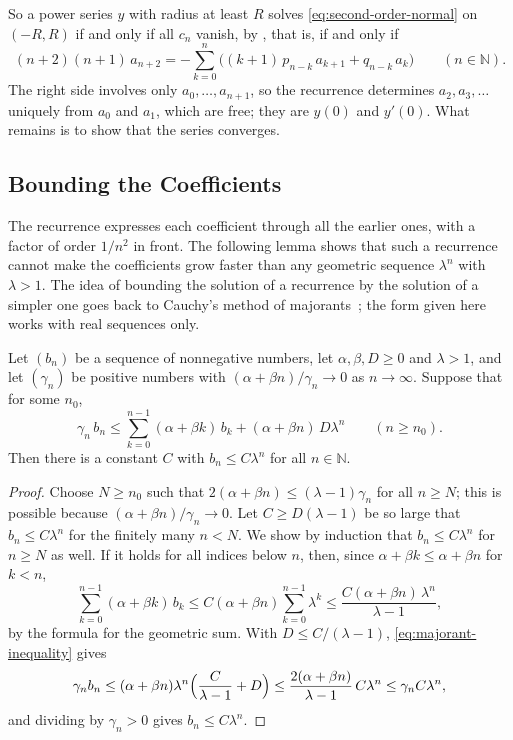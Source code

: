 So a power series $y$ with radius at least $R$ solves \eqref{eq:second-order-normal} on $(-R,R)$ if and only if all $c_n$ vanish, by , that is, if and only if
\begin{equation}
(n+2)(n+1)\,a_{n+2}=-\sum_{k=0}^n\bigl((k+1)\,p_{n-k}\,a_{k+1}+q_{n-k}\,a_k\bigr)\qquad(n\in\mathbb N).
\label{eq:ordinary-recurrence}
\end{equation}
The right side involves only $a_0,\ldots,a_{n+1}$, so the recurrence determines $a_2,a_3,\ldots$ uniquely from $a_0$ and $a_1$, which are free; they are $y(0)$ and $y'(0)$. What remains is to show that the series converges.

\subsection{Bounding the Coefficients}

The recurrence expresses each coefficient through all the earlier ones, with a factor of order $1/n^2$ in front. The following lemma shows that such a recurrence cannot make the coefficients grow faster than any geometric sequence $\lambda^n$ with $\lambda>1$. The idea of bounding the solution of a recurrence by the solution of a simpler one goes back to Cauchy's method of majorants~\cite[Chap.~2]{hille1976}; the form given here works with real sequences only.

\begin{lemma}
\label{lem:coefficient-growth}
Let $(b_n)$ be a sequence of nonnegative numbers, let $\alpha,\beta,D\ge0$ and $\lambda>1$, and let $(\gamma_n)$ be positive numbers with $(\alpha+\beta n)/\gamma_n\to0$ as $n\to\infty$. Suppose that for some $n_0$,
\begin{equation}
\gamma_n\,b_n\le\sum_{k=0}^{n-1}(\alpha+\beta k)\,b_k+(\alpha+\beta n)\,D\lambda^n\qquad(n\ge n_0).
\label{eq:majorant-inequality}
\end{equation}
Then there is a constant $C$ with $b_n\le C\lambda^n$ for all $n\in\mathbb N$.
\end{lemma}

\begin{proof}
Choose $N\ge n_0$ such that $2(\alpha+\beta n)\le(\lambda-1)\gamma_n$ for all $n\ge N$; this is possible because $(\alpha+\beta n)/\gamma_n\to0$. Let $C\ge D(\lambda-1)$ be so large that $b_n\le C\lambda^n$ for the finitely many $n<N$. We show by induction that $b_n\le C\lambda^n$ for $n\ge N$ as well. If it holds for all indices below $n$, then, since $\alpha+\beta k\le\alpha+\beta n$ for $k<n$,
\[
\sum_{k=0}^{n-1}(\alpha+\beta k)\,b_k\le C(\alpha+\beta n)\sum_{k=0}^{n-1}\lambda^k\le\frac{C(\alpha+\beta n)\,\lambda^n}{\lambda-1},
\]
by the formula for the geometric sum. With $D\le C/(\lambda-1)$, \eqref{eq:majorant-inequality} gives
\[
\gamma_nb_n\le(\alpha+\beta n)\lambda^n\Bigl(\frac C{\lambda-1}+D\Bigr)\le\frac{2(\alpha+\beta n)}{\lambda-1}\,C\lambda^n\le\gamma_nC\lambda^n,
\]
and dividing by $\gamma_n>0$ gives $b_n\le C\lambda^n$.
\end{proof}


